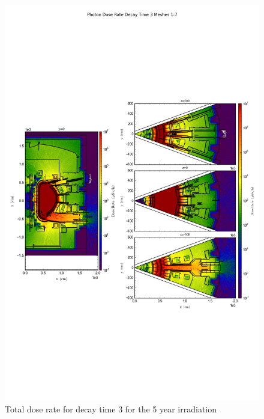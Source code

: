 \documentclass[12pt]{article}
\begin{document}
\begin{figure}[ht!]
\centering
\includegraphics[trim={0cm 8cm, 0cm 8cm},clip,scale=0.75]{../plots/final_model_with_b4c/5year/Photon_Dose_Rate_Decay_Time_3_Meshes_1-7.png}
\caption{Total dose rate for decay time 3 for the 5 year irradiation}
\label{fig:photons_5y_dc3_b4c_dose}
\end{figure}
\end{document}
